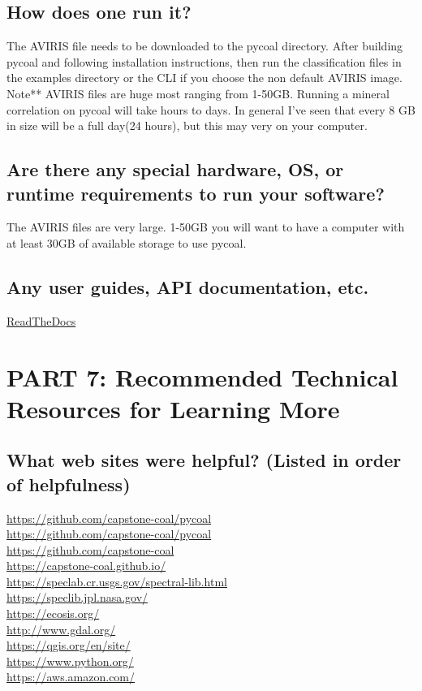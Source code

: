 \documentclass[onecolumn, draftclsnofoot,10pt, compsoc]{IEEEtran}
\begin{document}
\subsection{How does one run it?}
The AVIRIS file needs to be downloaded to the pycoal directory.  After building pycoal and following installation instructions, then run the classification files in the examples directory or the CLI if you choose the non default AVIRIS image.  Note** AVIRIS files are huge most ranging from 1-50GB. Running a mineral correlation on pycoal will take hours to days. In general I’ve seen that every 8 GB in size will be a full day(24 hours), but this may very on your computer.

\subsection{Are there any special hardware, OS, or runtime requirements to run your software?}
The AVIRIS files are very large. 1-50GB you will want to have a computer with at least 30GB of available storage to use pycoal. 

\subsection{Any user guides, API documentation, etc.}
\href{http://pycoal.readthedocs.io/en/latest/}{ReadTheDocs} 

\section{PART 7: Recommended Technical Resources for Learning More}
\subsection{What web sites were helpful? (Listed in order of helpfulness)}
\url{https://github.com/capstone-coal/pycoal} \\
\url{https://github.com/capstone-coal/pycoal} \\
\url{https://github.com/capstone-coal} \\
\url{https://capstone-coal.github.io/} \\
\url{https://speclab.cr.usgs.gov/spectral-lib.html} \\
\url{https://speclib.jpl.nasa.gov/} \\
\url{https://ecosis.org/} \\
\url{http://www.gdal.org/} \\
\url{https://qgis.org/en/site/} \\
\url{https://www.python.org/} \\
\url{https://aws.amazon.com/} \\
\end{document}
